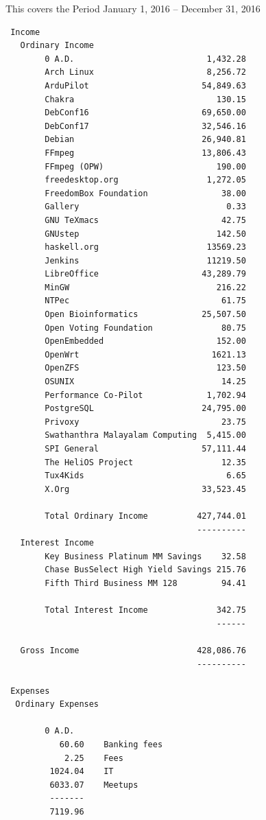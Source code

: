 \documentclass[letterpaper]{report}
\begin{document}
This covers the Period January 1, 2016 -- December 31, 2016

\begin{verbatim}
 Income
   Ordinary Income
        0 A.D.                           1,432.28
        Arch Linux                       8,256.72
        ArduPilot                       54,849.63
        Chakra                             130.15
        DebConf16                       69,650.00
        DebConf17                       32,546.16
        Debian                          26,940.81
        FFmpeg                          13,806.43
        FFmpeg (OPW)                       190.00
        freedesktop.org                  1,272.05
        FreedomBox Foundation               38.00
        Gallery                              0.33
        GNU TeXmacs                         42.75
        GNUstep                            142.50
        haskell.org                      13569.23
        Jenkins                          11219.50
        LibreOffice                     43,289.79
        MinGW                              216.22
        NTPec                               61.75
        Open Bioinformatics             25,507.50
        Open Voting Foundation              80.75
        OpenEmbedded                       152.00
        OpenWrt                           1621.13
        OpenZFS                            123.50
        OSUNIX                              14.25
        Performance Co-Pilot             1,702.94
        PostgreSQL                      24,795.00
        Privoxy                             23.75
        Swathanthra Malayalam Computing  5,415.00
        SPI General                     57,111.44
        The HeliOS Project                  12.35
        Tux4Kids                             6.65
        X.Org                           33,523.45

        Total Ordinary Income          427,744.01
                                       ----------
   Interest Income
        Key Business Platinum MM Savings    32.58
        Chase BusSelect High Yield Savings 215.76
        Fifth Third Business MM 128         94.41

        Total Interest Income              342.75
                                           ------

   Gross Income                        428,086.76
                                       ----------

 Expenses
  Ordinary Expenses

        0 A.D.
           60.60    Banking fees
            2.25    Fees
         1024.04    IT
         6033.07    Meetups
         -------
         7119.96


\end{verbatim}
\end{document}
